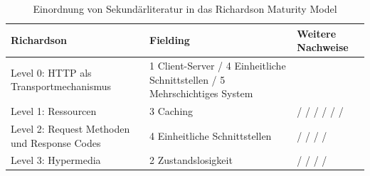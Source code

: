 \begin{table}
\footnotesize
\begin{tabular}{p{3cm}|p{6cm}|p{6cm}}
    \textbf{Richardson} & \textbf{Fielding} & \textbf{Weitere Nachweise} \\
    \hline
    Level 0: HTTP als Transportmechanismus & 1 Client-Server / 4 Einheitliche Schnittstellen / 5 Mehrschichtiges System  & \cite{fielding_architectural_2000} \\
    \hline
    Level 1: Ressourcen & 3 Caching & \cite{fowler_richardson_2010} / \cite[S. 79]{richardson_restful_2007} / \cite{berners-lee_univeral_1996} / \cite[S. 105]{richardson_restful_2007} / \cite[S. 40]{tilkov_rest_2015} \cite{megginson_rest_2007} / \cite[S. 3]{pautasso_restful_2014} / \cite{fielding_hypertext_1999} \\
    \hline
    Level 2: Request Methoden und Response Codes & 4 Einheitliche Schnittstellen  & \cite[S. 15]{pautasso_rest_2009} / \cite[S. 237]{franch_detection_2014} / \cite[S. 23]{masse_rest_2012} / \cite[S. 53]{tilkov_rest_2015} / \cite{richardson_restful_2007} \\
    \hline
    Level 3: Hypermedia & 2 Zustandslosigkeit  & \cite{fowler_richardson_2010} / \cite{richardson_justice_2008} / \cite{pautasso_restful_2014} / \cite{richardson_restful_2007} / \cite{tilkov_rest_2015}  \\
\end{tabular}
\caption{Einordnung von Sekundärliteratur in das Richardson Maturity Model}
\label{tab:EinordnungRichardson}
\end{table}

